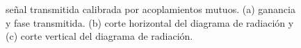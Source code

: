 \begin{figure}[H]
	\centering

	\caption{señal transmitida calibrada por acoplamientos mutuos. (a) ganancia y fase transmitida. (b) corte horizontal del 
	diagrama de radiación y (c) corte vertical del diagrama de radiación.}
	\label{fig:compErrMutual0deg}
\end{figure}

